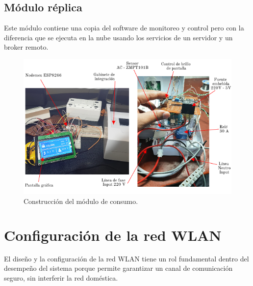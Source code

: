 \subsection{Módulo réplica}
Este módulo contiene una copia del software de monitoreo y control pero con la diferencia que se ejecuta en la nube usando los servicios de un servidor y un broker remoto.

\vspace{1.0cm}
\begin{figure}[htpb]
\centering 
\includegraphics[width=1.0\textwidth]{./Figures/moduloconsumo.png}
\caption{Construcción del módulo de consumo.}
\label{fig:modconsumo}
\end{figure}



\section{Configuración de la red WLAN}

El diseño y la configuración de la red WLAN tiene un rol fundamental dentro del desempeño del sistema porque permite garantizar un canal de comunicación seguro, sin interferir la red doméstica.

